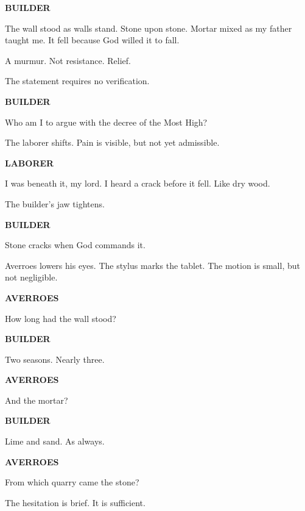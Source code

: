 \medskip

\textbf{BUILDER}

The wall stood as walls stand. Stone upon stone. Mortar mixed as my father
taught me. It fell because God willed it to fall.

\medskip

A murmur. Not resistance. Relief.

The statement requires no verification.

\medskip

\textbf{BUILDER}

Who am I to argue with the decree of the Most High?

\medskip

The laborer shifts. Pain is visible, but not yet admissible.

\medskip

\textbf{LABORER}

I was beneath it, my lord. I heard a crack before it fell. Like dry wood.

\medskip

The builder's jaw tightens.

\medskip

\textbf{BUILDER}

Stone cracks when God commands it.

\medskip

Averroes lowers his eyes. The stylus marks the tablet. The motion is small,
but not negligible.

\medskip

\textbf{AVERROES}

How long had the wall stood?

\medskip

\textbf{BUILDER}

Two seasons. Nearly three.

\medskip

\textbf{AVERROES}

And the mortar?

\medskip

\textbf{BUILDER}

Lime and sand. As always.

\medskip

\textbf{AVERROES}

From which quarry came the stone?

\medskip

The hesitation is brief. It is sufficient.

\medskip

